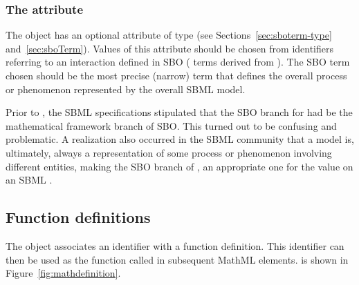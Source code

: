 \subsubsection{The  attribute}
\label{sec:model-sboterm}

The \Model object has an optional  attribute of
type  (see Sections~\ref{sec:sboterm-type}
and~\ref{sec:sboTerm}).  Values of this attribute should be chosen
from identifiers referring to an interaction defined in SBO (\ie
terms derived from \sbointeraction).  The SBO term
chosen should be the most precise (narrow) term that defines the
overall process or phenomenon represented by the overall SBML
  model.



Prior to \sbmltwofour, the SBML specifications stipulated that the
SBO branch for \Model had be the mathematical framework
branch of SBO.  This turned out to be confusing and problematic.
A realization also occurred in the SBML community that a
model is, ultimately, always a representation of some 
process or phenomenon involving different entities, making the SBO
branch of \sbointeraction, an appropriate one for the
 value on an SBML \Model.




\subsection{Function definitions}
\label{sec:functiondefinition}

The \FunctionDefinition object associates an identifier with a
function definition.  This identifier can then be used as the
function called in subsequent MathML  elements.
\FunctionDefinition is shown in Figure~\vref{fig:mathdefinition}.

